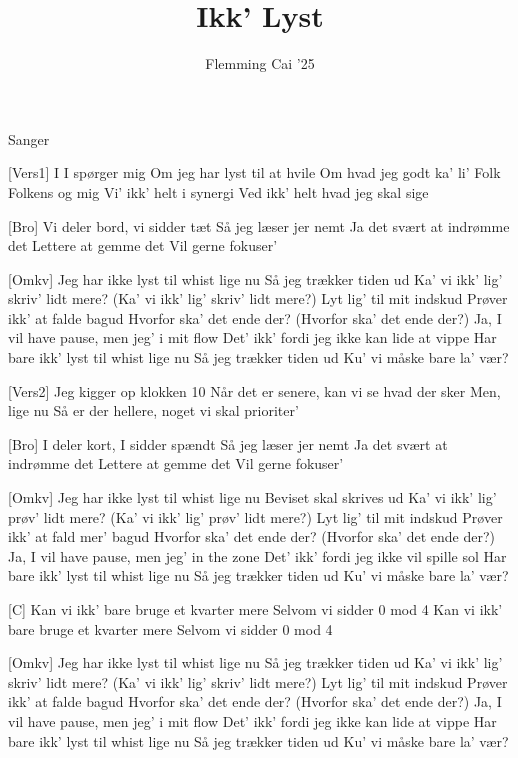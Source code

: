 \documentclass[a4paper,11pt]{article}
\title{Ikk' Lyst}
\author{Flemming Cai '25}
\begin{document}
\maketitle

\begin{roles}
 Sanger
\end{roles}

\begin{song}
  [Vers1] I
  I spørger mig
  Om jeg har lyst til at hvile
  Om hvad jeg godt ka' li'
  Folk
  Folkens og mig
  Vi' ikk' helt i synergi
  Ved ikk' helt hvad jeg skal sige

  [Bro] Vi deler bord, vi sidder tæt
  Så jeg læser jer nemt
  Ja det svært at indrømme det
  Lettere at gemme det
  Vil gerne fokuser'

  [Omkv] Jeg har ikke lyst til whist lige nu
  Så jeg trækker tiden ud
  Ka’ vi ikk’ lig’ skriv’ lidt mere? (Ka' vi ikk' lig’ skriv’ lidt mere?)
  Lyt lig’ til mit indskud
  Prøver ikk’ at falde bagud
  Hvorfor ska' det ende der? (Hvorfor ska' det ende der?)
  Ja, I vil have pause, men jeg' i mit flow
  Det' ikk' fordi jeg ikke kan lide at vippe
  Har bare ikk' lyst til whist lige nu
  Så jeg trækker tiden ud
  Ku' vi måske bare la' vær?

  [Vers2] Jeg kigger op klokken 10
  Når det er senere, kan vi se hvad der sker
  Men, lige nu
  Så er der hellere, noget vi skal prioriter'

  [Bro] I deler kort, I sidder spændt
  Så jeg læser jer nemt
  Ja det svært at indrømme det
  Lettere at gemme det
  Vil gerne fokuser'

  [Omkv] Jeg har ikke lyst til whist lige nu
  Beviset skal skrives ud
  Ka’ vi ikk’ lig’ prøv’ lidt mere? (Ka' vi ikk' lig’ prøv’ lidt mere?)
  Lyt lig’ til mit indskud
  Prøver ikk’ at fald mer' bagud
  Hvorfor ska' det ende der? (Hvorfor ska' det ende der?)
  Ja, I vil have pause, men jeg' in the zone
  Det' ikk' fordi jeg ikke vil spille sol
  Har bare ikk' lyst til whist lige nu
  Så jeg trækker tiden ud
  Ku' vi måske bare la' vær?

  [C] Kan vi ikk’ bare bruge et kvarter mere
  Selvom vi sidder 0 mod 4
  Kan vi ikk’ bare bruge et kvarter mere
  Selvom vi sidder 0 mod 4

  [Omkv] Jeg har ikke lyst til whist lige nu
  Så jeg trækker tiden ud
  Ka’ vi ikk’ lig’ skriv’ lidt mere? (Ka' vi ikk' lig’ skriv’ lidt mere?)
  Lyt lig’ til mit indskud
  Prøver ikk’ at falde bagud
  Hvorfor ska' det ende der? (Hvorfor ska' det ende der?)
  Ja, I vil have pause, men jeg' i mit flow
  Det' ikk' fordi jeg ikke kan lide at vippe
  Har bare ikk' lyst til whist lige nu
  Så jeg trækker tiden ud
  Ku' vi måske bare la' vær?
  
\end{song}
\end{document}
